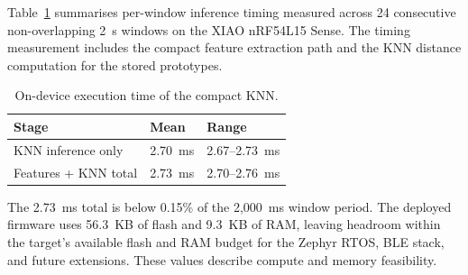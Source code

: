 Table~\ref{tab:knn_timing} summarises per-window inference timing measured across 24 consecutive non-overlapping 2~s windows on the XIAO nRF54L15 Sense. The timing measurement includes the compact feature extraction path and the KNN distance computation for the stored prototypes.

\begin{table}[H]
    \centering
    \footnotesize
    \caption{On-device execution time of the compact KNN.}
    \label{tab:knn_timing}
    \begin{tabularx}{\linewidth}{lXX}
        \toprule
        Stage & Mean & Range \\
        \midrule
        KNN inference only           & 2.70~ms & 2.67--2.73~ms \\
        Features + KNN total         & 2.73~ms & 2.70--2.76~ms \\
        \bottomrule
    \end{tabularx}
\end{table}

The 2.73~ms total is below 0.15\% of the 2{,}000~ms window period. The deployed firmware uses 56.3~KB of flash and 9.3~KB of RAM, leaving headroom within the target's available flash and RAM budget for the Zephyr RTOS, BLE stack, and future extensions. These values describe compute and memory feasibility.
